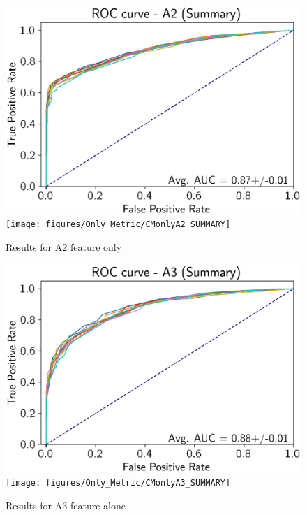 \begin{figure}[h]
\noindent \begin{centering}
\caption{\label{F5}Results for A2 feature only}
\par\end{centering}
\noindent \raggedleft{}\includegraphics[width=0.48\columnwidth]{figures/Only_Metric/ROConlyA2_SUMMARY}\texttt{[image: figures/Only\_Metric/CMonlyA2\_SUMMARY]}
\end{figure}

\begin{figure}[h]
\noindent \begin{centering}
\caption{\label{F6}Results for A3 feature alone}
\par\end{centering}
\noindent \raggedleft{}\includegraphics[width=0.48\columnwidth]{figures/Only_Metric/ROConlyA3_SUMMARY}\texttt{[image: figures/Only\_Metric/CMonlyA3\_SUMMARY]}
\end{figure}
